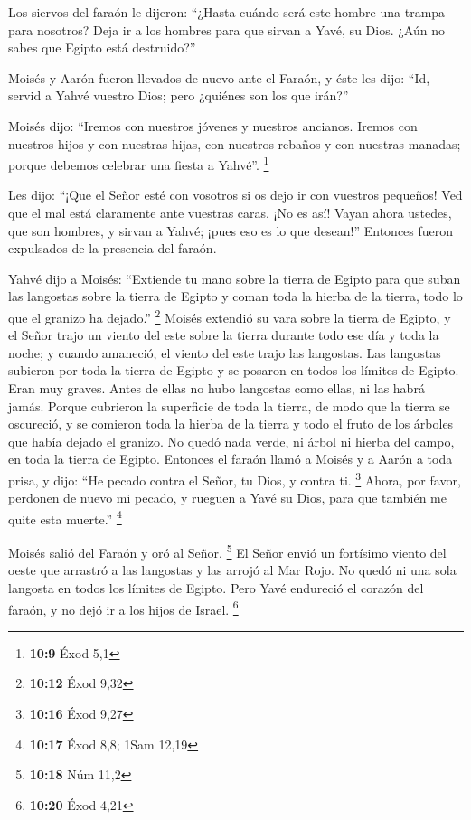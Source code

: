 \begin{paracol}{2}
 Los siervos del faraón le dijeron: ``¿Hasta cuándo será
este hombre una trampa para nosotros? Deja ir a los hombres para que
sirvan a Yavé, su Dios. ¿Aún no sabes que Egipto está destruido?''

 Moisés y Aarón fueron llevados de nuevo ante el Faraón, y
éste les dijo: ``Id, servid a Yahvé vuestro Dios; pero ¿quiénes son los
que irán?''

 Moisés dijo: ``Iremos con nuestros jóvenes y nuestros
ancianos. Iremos con nuestros hijos y con nuestras hijas, con nuestros
rebaños y con nuestras manadas; porque debemos celebrar una fiesta a
Yahvé''. \footnote{\textbf{10:9} Éxod 5,1}

 Les dijo: ``¡Que el Señor esté con vosotros si os dejo
ir con vuestros pequeños! Ved que el mal está claramente ante vuestras
caras.  ¡No es así! Vayan ahora ustedes, que son hombres,
y sirvan a Yahvé; ¡pues eso es lo que desean!'' Entonces fueron
expulsados de la presencia del faraón.

 Yahvé dijo a Moisés: ``Extiende tu mano sobre la tierra
de Egipto para que suban las langostas sobre la tierra de Egipto y coman
toda la hierba de la tierra, todo lo que el granizo ha dejado.''
\footnote{\textbf{10:12} Éxod 9,32}  Moisés extendió su
vara sobre la tierra de Egipto, y el Señor trajo un viento del este
sobre la tierra durante todo ese día y toda la noche; y cuando amaneció,
el viento del este trajo las langostas.  Las langostas
subieron por toda la tierra de Egipto y se posaron en todos los límites
de Egipto. Eran muy graves. Antes de ellas no hubo langostas como ellas,
ni las habrá jamás.  Porque cubrieron la superficie de
toda la tierra, de modo que la tierra se oscureció, y se comieron toda
la hierba de la tierra y todo el fruto de los árboles que había dejado
el granizo. No quedó nada verde, ni árbol ni hierba del campo, en toda
la tierra de Egipto.  Entonces el faraón llamó a Moisés y
a Aarón a toda prisa, y dijo: ``He pecado contra el Señor, tu Dios, y
contra ti. \footnote{\textbf{10:16} Éxod 9,27}  Ahora,
por favor, perdonen de nuevo mi pecado, y rueguen a Yavé su Dios, para
que también me quite esta muerte.'' \footnote{\textbf{10:17} Éxod 8,8;
  1Sam 12,19}

 Moisés salió del Faraón y oró al Señor. \footnote{\textbf{10:18}
  Núm 11,2}  El Señor envió un fortísimo viento del oeste
que arrastró a las langostas y las arrojó al Mar Rojo. No quedó ni una
sola langosta en todos los límites de Egipto.  Pero Yavé
endureció el corazón del faraón, y no dejó ir a los hijos de Israel.
\footnote{\textbf{10:20} Éxod 4,21}


\end{paracol}
